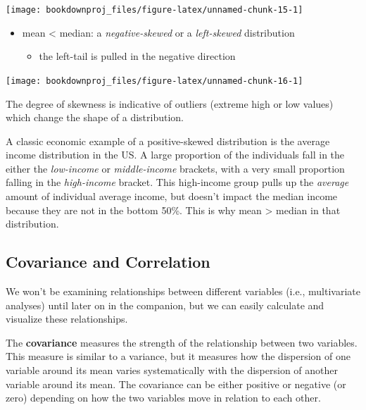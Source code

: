 \documentclass[
]{book}
\providecommand{\tightlist}{%
  \setlength{\itemsep}{0pt}\setlength{\parskip}{0pt}}
\begin{document}
\begin{center}\texttt{[image: bookdownproj\_files/figure-latex/unnamed-chunk-15-1]} \end{center}

\begin{itemize}
\item
  mean \textless{} median: a \emph{negative-skewed} or a \emph{left-skewed} distribution

  \begin{itemize}
  \tightlist
  \item
    the left-tail is pulled in the negative direction
  \end{itemize}
\end{itemize}

\begin{center}\texttt{[image: bookdownproj\_files/figure-latex/unnamed-chunk-16-1]} \end{center}

The degree of skewness is indicative of outliers (extreme high or low values) which change the shape of a distribution.

A classic economic example of a positive-skewed distribution is the average income distribution in the US. A large proportion of the individuals fall in the either the \emph{low-income} or \emph{middle-income} brackets, with a very small proportion falling in the \emph{high-income} bracket. This high-income group pulls up the \emph{average} amount of individual average income, but doesn't impact the median income because they are not in the bottom 50\%. This is why mean \textgreater{} median in that distribution.

\hypertarget{covariance-and-correlation}{%
\subsection{Covariance and Correlation}\label{covariance-and-correlation}}

We won't be examining relationships between different variables (i.e., multivariate analyses) until later on in the companion, but we can easily calculate and visualize these relationships.

The \textbf{covariance} measures the strength of the relationship between two variables. This measure is similar to a variance, but it measures how the dispersion of one variable around its mean varies systematically with the dispersion of another variable around its mean. The covariance can be either positive or negative (or zero) depending on how the two variables move in relation to each other.
\end{document}
